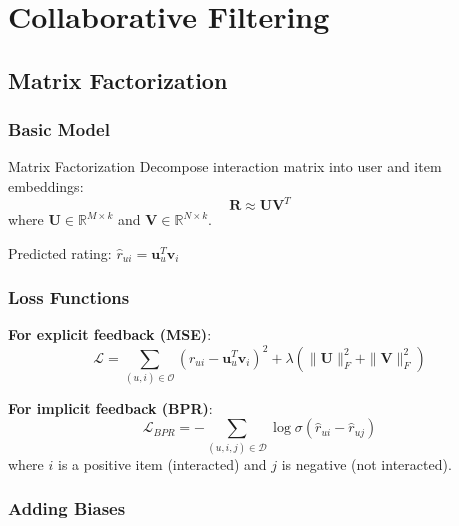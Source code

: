 \section{Collaborative Filtering}
\label{sr:sec:collaborative_filtering}

\subsection{Matrix Factorization}

\subsubsection{Basic Model}

\begin{mathresult}{Matrix Factorization}
Decompose interaction matrix into user and item embeddings:
\begin{equation}
\mathbf{R} \approx \mathbf{U}\mathbf{V}^T
\end{equation}
where $\mathbf{U} \in \mathbb{R}^{M \times k}$ and $\mathbf{V} \in \mathbb{R}^{N \times k}$.

Predicted rating: $\hat{r}_{ui} = \mathbf{u}_u^T \mathbf{v}_i$
\end{mathresult}

\subsubsection{Loss Functions}

\textbf{For explicit feedback (MSE)}:
\begin{equation}
\mathcal{L} = \sum_{(u,i) \in \mathcal{O}} (r_{ui} - \mathbf{u}_u^T \mathbf{v}_i)^2 + \lambda(\|\mathbf{U}\|_F^2 + \|\mathbf{V}\|_F^2)
\end{equation}

\textbf{For implicit feedback (BPR)}:
\begin{equation}
\mathcal{L}_{BPR} = -\sum_{(u,i,j) \in \mathcal{D}} \log \sigma(\hat{r}_{ui} - \hat{r}_{uj})
\end{equation}
where $i$ is a positive item (interacted) and $j$ is negative (not interacted).

\subsubsection{Adding Biases}

